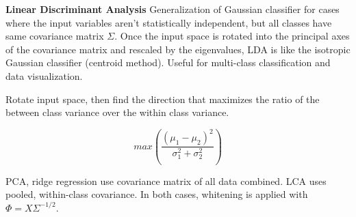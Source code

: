 \documentclass[10pt,landscape]{article}
\begin{document}
\begin{multicols}{3}
\textbf{Linear Discriminant Analysis} Generalization of Gaussian classifier for cases where the input variables aren't statistically independent, but all classes have same covariance matrix $\Sigma$. Once the input space is rotated into the principal axes of the covariance matrix and rescaled by the eigenvalues, LDA is like the isotropic Gaussian classifier (centroid method). Useful for multi-class classification and data visualization.

Rotate input space, then find the direction that maximizes the ratio of the between class variance over the within class variance.

\begin{equation*}
max\left(\frac{(\mu_1 - \mu_2)^2}{\sigma_1^2 + \sigma_2^2}\right)
\end{equation*}

PCA, ridge regression use covariance matrix of all data combined. LCA uses pooled, within-class covariance. In both cases, whitening is applied with $\Phi = X \Sigma ^{-1/2}$. 

\end{multicols}
\end{document}
